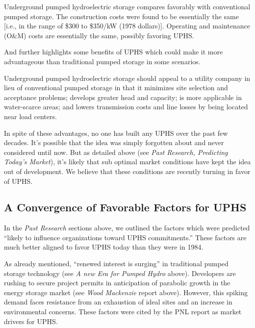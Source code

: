 \documentclass[hidelinks,12pt,a4paper]{article}
\begin{document}
\begin{displayquote}
Underground pumped hydroelectric storage compares favorably with conventional pumped storage. The construction costs were found to be essentially the same [i.e., in the range of \$300 to \$350/kW (1978 dollars)]. Operating and maintenance (O\&M) costs are essentially the same, possibly favoring UPHS. \cite{UndergroundPumpedHydroelectricStorage}
\end{displayquote}

And further highlights some benefits of UPHS which could make it more advantageous than traditional pumped storage in some scenarios.

\begin{displayquote}
Underground pumped hydroelectric storage should appeal to a utility company in lieu of conventional pumped storage in that it minimizes site selection and acceptance problems; develops greater head and capacity; is more applicable in water-scarce areas; and lowers transmission costs and line losses by being located near load centers. \cite{UndergroundPumpedHydroelectricStorage}
\end{displayquote}


In spite of these advantages, no one has built any UPHS over the past few decades. It's possible that the idea was simply forgotten about and never considered until now. But as detailed above (see \textit{Past Research, Predicting Today's Market}), it's likely that sub optimal market conditions have kept the idea out of development. We believe that these conditions are recently turning in favor of UPHS.

\subsection{A Convergence of Favorable Factors for UPHS}
In the \textit{Past Research} sections above, we outlined the factors which were predicted “likely to influence organizations toward UPHS commitments.” These factors are much better aligned to favor UPHS today than they were in 1984.

As already mentioned, “renewed interest is surging” in traditional pumped storage technology (see \textit{A new Era for Pumped Hydro} above). Developers are rushing to secure project permits in anticipation of parabolic growth in the energy storage market (see \textit{Wood Mackenzie} report above). However, this spiking demand faces resistance from an exhaustion of ideal sites and an increase in environmental concerns. These factors were cited by the PNL report as market drivers for UPHS.
\end{document}
